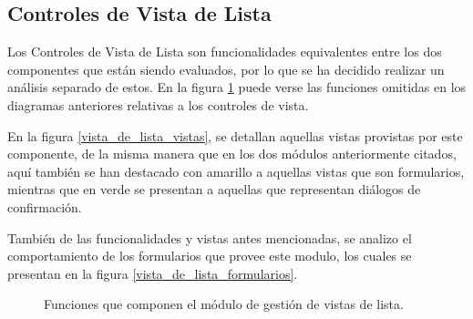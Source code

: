 \subsection{Controles de Vista de Lista}
Los Controles de Vista de Lista son funcionalidades equivalentes entre los 
dos componentes que están siendo evaluados, por lo que se ha decidido realizar
un análisis separado de estos. En la figura \ref{vista_de_lista} puede verse
las funciones omitidas en los diagramas anteriores relativas a los controles de
vista.

En la figura \ref{vista_de_lista_vistas}, se detallan aquellas vistas
provistas por este componente, de la misma manera que en los dos módulos
anteriormente citados, aquí también se han destacado con amarillo a
aquellas vistas que son formularios, mientras que en verde se presentan a
aquellas que representan diálogos de confirmación.

También de las funcionalidades y vistas antes mencionadas, se analizo el
comportamiento de los formularios que provee este modulo, los cuales se
presentan en la figura \ref{vista_de_lista_formularios}.

\begin{figure}[H]
\centering
{}
\caption{Funciones que componen el módulo de gestión de vistas de lista.}
\label{vista_de_lista}
\end{figure}

